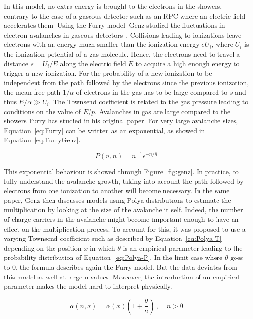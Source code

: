 	In this model, no extra energy is brought to the electrons in the showers, contrary to the case of a gaseous detector such as an RPC where an electric field accelerates them. Using the Furry model, Genz studied the fluctuations in electron avalanches in gaseous detectors~\cite{GENZ1973}. Collisions leading to ionizations leave electrons with an energy much smaller than the ionization energy $eU_i$, where $U_i$ is the ionization potential of a gas molecule. Hence, the electrons need to travel a distance $s = U_i/E$ along the electric field $E$ to acquire a high enough energy to trigger a new ionization. For the probability of a new ionization to be independent from the path followed by the electrons since the previous ionization, the mean free path $1/\alpha$ of electrons in the gas has to be large compared to $s$ and thus $E/\alpha \gg U_i$. The Townsend coefficient is related to the gas pressure leading to conditions on the value of $E/p$. Avalanches in gas are large compared to the showers Furry has studied in his original paper. For very large avalanche sizes, Equation~\ref{eq:Furry} can be written as an exponential, as showed in Equation~\ref{eq:FurryGenz}.
	
	\begin{equation}
	\label{eq:FurryGenz}
	P(n,\bar{n}) = \bar{n}^{-1} e^{-n/\bar{n}}
	\end{equation}
	
	This exponential behaviour is showed through Figure~\ref{fig:genz}. In practice, to fully understand the avalanche growth, taking into account the path followed by electrons from one ionization to another will become necessary. In the same paper, Genz then discusses models using Polya distributions to estimate the multiplication by looking at the size of the avalanche it self. Indeed, the number of charge carriers in the avalanche might become important enough to have an effect on the multiplication process. To account for this, it was proposed to use a varying Townsend coefficient such as described by Equation~\ref{eq:Polya-T} depending on the position $x$ in which $\theta$ is an empirical parameter leading to the probability distribution of Equation~\ref{eq:Polya-P}. In the limit case where $\theta$ goes to 0, the formula describes again the Furry model. But the data deviates from this model as well at large n values. Moreover, the introduction of an empirical parameter makes the model hard to interpret physically.
	
	\begin{equation}
	\label{eq:Polya-T}
	\alpha(n,x) = \alpha(x) \left( 1 + \frac{\theta}{n} \right) \, , \;\;\;\; n > 0
	\end{equation}
	
